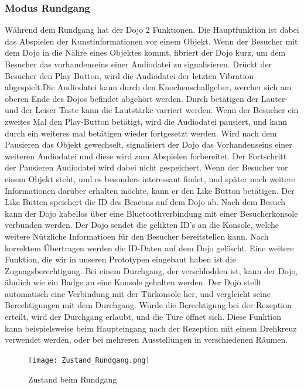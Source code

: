 \subsubsection{Modus Rundgang}
Während dem Rundgang hat der Dojo 2 Funktionen. Die Hauptfunktion ist dabei das Abspielen der Kunstinformationen vor einem Objekt. Wenn der Besucher mit dem Dojo in die Nähre eines Objektes kommt, fibriert der Dojo kurz, um dem Besucher das vorhandenseins einer Audiodatei zu signalisieren. Drückt der Besucher den Play Button, wird die Audiodatei der letzten Vibration abgespielt.Die Audiodatei kann durch den Knochenschallgeber, wercher sich am oberen Ende des Dojos befindet abgehört werden. Durch betätigen der Lauter-und der Leiser Taste kann die Lautstärke varriert werden. Wenn der Besucher ein zweites Mal den Play-Button betätigt, wird die Audiodatei pausiert, und kann durch ein weiteres mal betätigen wieder fortgesetzt werden. Wird nach dem Pausieren das Objekt gewechselt, signalisiert der Dojo das Vorhandenseins einer weiteren Audiodatei und diese wird zum Abspielen forbereitet. Der Fortschritt der Pausieren Audiodatei wird dabei nicht gespeichert. Wenn der Besucher vor einem Objekt steht, und es besonders interessant findet, und später noch weitere Informationen darüber erhalten möchte, kann er den Like Button betätigen. Der Like Butten speichert die ID des Beacons auf dem Dojo ab. Nach dem Besuch kann der Dojo kabellos über eine Bluetoothverbindung mit einer Besucherkonsole verbunden werden. Der Dojo sendet die gelikten ID's an die Konsole, welche weitere Nützliche Informatioen für den Besucher bereitstellen kann. Nach korrektem Übertragen werden die ID-Daten auf dem Dojo gelöscht.
Eine weitere Funktion, die wir in unseren Prototypen eingebaut haben ist die Zugnagsberechtigung. Bei einem Durchgang, der verschlodden ist, kann der Dojo, ähnlich wie ein Badge an eine Konsole gehalten werden. Der Dojo stellt automatisch eine Verbindung mit der Türkonsole her, und vergleicht seine Berechtigungen mit dem Durchgang. Wurde die Berechtigung bei der Rezeption erteilt, wird der Durchgang erlaubt, und die Türe öffnet sich. Diese Funktion kann beispielsweise beim Haupteingang nach der Rezeption mit einem Drehkreuz verwendet werden, oder bei mehreren Ausstellungen in verschiedenen Räumen.
\begin{figure}[htb]
\texttt{[image: Zustand\_Rundgang.png]}
\caption{Zustand beim Rundgang} %
\label{fig:image4}
\end{figure}











